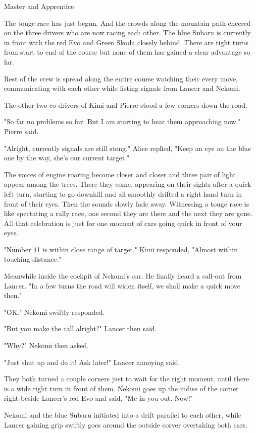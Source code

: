 \h{Master and Apprentice}

The touge race has just begun. And the crowds along the mountain path cheered on the three drivers who are now racing each other. The blue Subaru is currently in front with the red Evo and Green Skoda closely behind. There are tight turns from start to end of the course but none of them has gained a clear advantage so far.

Rest of the crew is spread along the entire course watching their every move, communicating with each other while listing signals from Lancer and Nekomi.

The other two co-drivers of Kimi and Pierre stood a few corners down the road.

"So far no problems so far. But I am starting to hear them approaching now." Pierre said.

"Alright, currently signals are still stong." Alice replied, "Keep an eye on the blue one by the way, she's our current target."

The voices of engine roaring become closer and closer and three pair of light appear among the trees. There they come, appearing on their sights after a quick left turn, starting to go downhill and all smoothly drifted a right hand turn in front of their eyes. Then the sounds slowly fade away. Witnessing a touge race is like spectating a rally race, one second they are there and the next they are gone. All that celebration is just for one moment of cars going quick in front of your eyes.

"Number 41 is within close range of target." Kimi responded, "Almost within touching distance."

Meanwhile inside the cockpit of Nekomi's car. He finally heard a call-out from Lancer. "In a few turns the road will widen itself, we shall make a quick move then."

"OK." Nekomi swiftly responded.

"But you make the call alright?" Lancer then said.

"Why?" Nekomi then asked.

"Just shut up and do it! Ask later!" Lancer annoying said.

They both turned a couple corners just to wait for the right moment, until there is a wide right turn in front of them. Nekomi goes up the indise of the corner right beside Lancer's red Evo and said, "Me in you out. Now!"

Nekomi and the blue Subaru initiated into a drift parallel to each other, while Lancer gaining grip swiftly goes around the outside corver overtaking both cars.

